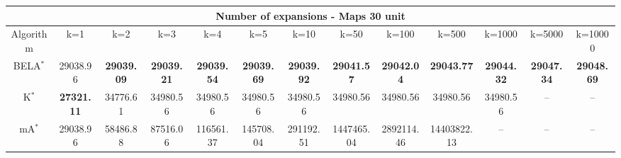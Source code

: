 \begin{tabular}{c|cccccccccccc}\toprule
\multicolumn{13}{c}{Number of expansions - Maps 30 unit}\\ \midrule
Algorithm & k=1 & k=2 & k=3 & k=4 & k=5 & k=10 & k=50 & k=100 & k=500 & k=1000 & k=5000 & k=10000 \\ \midrule
BELA$^*$ & 29038.96 & \textbf{29039.09} & \textbf{29039.21} & \textbf{29039.54} & \textbf{29039.69} & \textbf{29039.92} & \textbf{29041.57} & \textbf{29042.04} & \textbf{29043.77} & \textbf{29044.32} & \textbf{29047.34} & \textbf{29048.69} \\
K$^*$ & \textbf{27321.11} & 34776.61 & 34980.56 & 34980.56 & 34980.56 & 34980.56 & 34980.56 & 34980.56 & 34980.56 & 34980.56 & -- & -- \\
mA$^*$ & 29038.96 & 58486.88 & 87516.06 & 116561.37 & 145708.04 & 291192.51 & 1447465.04 & 2892114.46 & 14403822.13 & -- & -- & -- \\ \bottomrule 
\end{tabular}
